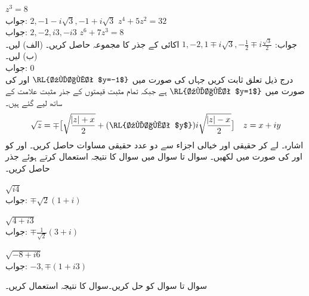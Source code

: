 \quad
$z^3=8$\\
جواب:\quad
$2,-1-i\sqrt{3},-1+i\sqrt{3}$
\quad
$z^4+5z^2=32$\\
جواب:\quad
$2,-2,i3,-i3$
\quad
$z^6+7z^3=8$\\
جواب:\quad
$1,-2,1\mp i \sqrt{3},-\tfrac{1}{2}\mp i \tfrac{\sqrt{3}}{2}$
\quad
اکائی کے  جذر کا مجموعہ حاصل کریں۔ (الف)  لیں۔ (ب)  لیں۔\\
جواب:\quad 
$0$
\quad {}\\
درج ذیل تعلق ثابت کریں جہاں  کی صورت میں 
$\text{\RL{علامت $y=-1$}}$
 اور  کی صورت میں 
$\text{\RL{علامت $y=1$}}$
 ہے جبکہ تمام مثبت قیمتوں کے جذر مثبت علامت کے ساتھ لیے گئے ہیں۔ 
\begin{align*}
\sqrt{z}=\mp\big[\sqrt{\frac{\abs{z}+x}{2}}+(\text{\RL{علامت $y$}})i\sqrt{\frac{\abs{z}-x}{2}}\big]\quad z=x+iy
\end{align*}
اشارہ۔  لے کر حقیقی اور خیالی اجزاء سے دو عدد حقیقی مساوات حاصل کریں۔ اور  کو  اور  کی صورت میں لکھیں۔
سوال  تا سوال  میں سوال  کا نتیجہ استعمال کرتے ہوئے جذر حاصل کریں۔

\quad
$\sqrt{i4}$\\
جواب:\quad
$\mp \sqrt{2}(1+i)$

\quad
$\sqrt{4+i3}$\\
جواب:\quad
$\mp \tfrac{1}{\sqrt{2}}(3+i)$

\quad
$\sqrt{-8+i6}$\\
جواب:\quad
$-3,\mp(1+i3)$

سوال  تا سوال  کو حل کریں۔سوال  کا نتیجہ استعمال کریں۔

